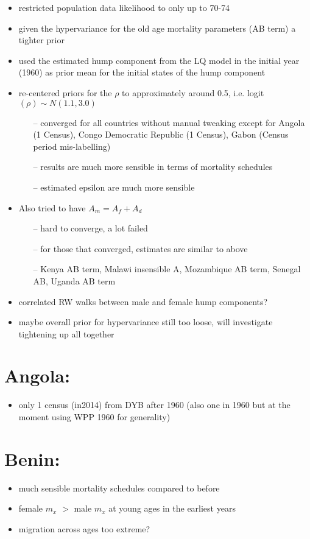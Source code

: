 \documentclass[12pt,a4paper]{article}
\date{\vspace{-5ex}}
\begin{document}
\begin{itemize}
\item restricted population data likelihood to only up to 70-74
\item given the hypervariance for the old age mortality parameters (AB term) a tighter prior
\item used the estimated hump component from the LQ model in the initial year (1960) as prior mean for the initial states of the hump component
\item re-centered priors for the $\rho$ to approximately around 0.5, i.e. logit$(\rho) \sim N(1.1, 3.0)$
	\begin{itemize}
	\item[--] converged for all countries without manual tweaking except for Angola (1 Census), Congo Democratic Republic (1 Census), Gabon (Census period mis-labelling)
	\item[--] results are much more sensible in terms of mortality schedules
	\item[--] estimated epsilon are much more sensible
	\end{itemize}

\item Also tried to have $A_m = A_f + A_d$
	\begin{itemize}
	\item[--] hard to converge, a lot failed
	\item[--] for those that converged, estimates are similar to above
	\item[--] Kenya AB term, Malawi insensible A, Mozambique AB term, Senegal AB, Uganda AB term
	\end{itemize}

\item correlated RW walks between male and female hump components?
\item maybe overall prior for hypervariance still too loose, will investigate tightening up all together
\end{itemize}

\section*{Angola:}
\begin{itemize}
\item only 1 census (in2014) from DYB after 1960 (also one in 1960 but at the moment using WPP 1960 for generality)
\end{itemize}

\section*{Benin:}
\begin{itemize}
\item much sensible mortality schedules compared to before
\item female $m_x$ $>$ male $m_x$ at young ages in the earliest years
\item migration across ages too extreme?
\end{itemize}
\end{document}
